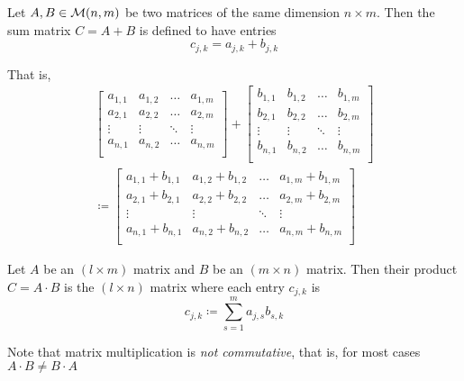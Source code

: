 \begin{definition}
    Let $A, B \in \mathcal{M}(n, m)$ be two matrices of the same dimension $n \times m$. Then the sum matrix $C = A + B$ is defined to have entries
    \begin{equation}
        c_{j, k} = a_{j, k} + b_{j, k}
    \end{equation}
    
    That is,
    \begin{equation}
        \begin{split}
            \begin{bmatrix}
                a_{1, 1} & a_{1, 2} & \dots  & a_{1, m} \\
                a_{2, 1} & a_{2, 2} & \dots  & a_{2, m} \\
                \vdots   & \vdots   & \ddots & \vdots   \\
                a_{n, 1} & a_{n, 2} & \dots & a_{n, m} \\
            \end{bmatrix} 
            + 
            \begin{bmatrix}
                b_{1, 1} & b_{1, 2} & \dots  & b_{1, m} \\
                b_{2, 1} & b_{2, 2} & \dots  & b_{2, m} \\
                \vdots   & \vdots   & \ddots & \vdots   \\
                b_{n, 1} & b_{n, 2} & \dots & b_{n, m} \\
            \end{bmatrix} \\
            \coloneqq
            \begin{bmatrix}
                a_{1, 1} + b_{1, 1} & a_{1, 2} + b_{1, 2} & \dots & a_{1, m} + b_{1, m} \\
                a_{2, 1} + b_{2, 1} & a_{2, 2} + b_{2, 2} & \dots & a_{2, m} + b_{2, m} \\
                \vdots   & \vdots   & \ddots & \vdots   \\
                a_{n, 1} + b_{n, 1} & a_{n, 2} + b_{n, 2} & \dots & a_{n, m} + b_{n, m} \\
            \end{bmatrix}
        \end{split}
    \end{equation}
\end{definition}

\begin{definition}
    Let $A$ be an $(l \times m)$ matrix and $B$ be an $(m \times n)$ matrix. Then their product $C = A \cdot B$ is the $(l \times n)$ matrix where each entry $c_{j, k}$ is
    \begin{equation}
        c_{j, k} \coloneqq \sum\limits^{m}_{s = 1} a_{j, s} b_{s, k}
    \end{equation}
    
    Note that matrix multiplication is \textit{not commutative}, that is, for most cases $A \cdot B \ne B \cdot A$
\end{definition}

